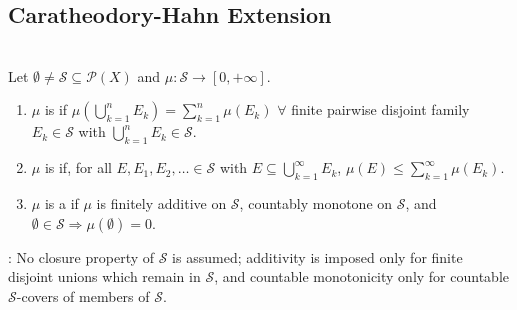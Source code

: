 \subsection{Caratheodory-Hahn Extension}

\begin{definition} \label{def:premeasure-on-set-family} \\
Let $\emptyset\neq\mathcal{S}\subseteq\mathcal{P}(X)$ and $\mu:\mathcal{S}\to[0,+\infty]$.
\begin{enumerate}[label=(\roman*)]
\setlength{\itemsep}{0pt}
\item $\mu$ is  if $\mu(\bigcup\limits_{k=1}^{n}E_k)=\sum\limits_{k=1}^{n}\mu(E_k)$ $\forall$ finite pairwise disjoint family $E_k\in\mathcal{S}$ with $\bigcup\limits_{k=1}^{n}E_k\in\mathcal{S}$.
\item $\mu$ is  if, for all $E,E_1,E_2,\ldots\in\mathcal{S}$ with $E\subseteq\bigcup\limits_{k=1}^{\infty}E_k$, $\mu(E)\leq\sum\limits_{k=1}^{\infty}\mu(E_k)$.
\item $\mu$ is a  if $\mu$ is finitely additive on $\mathcal{S}$, countably monotone on $\mathcal{S}$, and $\emptyset\in\mathcal{S}\Rightarrow\mu(\emptyset)=0$.
\end{enumerate}
: No closure property of $\mathcal{S}$ is assumed; additivity is imposed only for finite disjoint unions which remain in $\mathcal{S}$, and countable monotonicity only for countable $\mathcal{S}$-covers of members of $\mathcal{S}$.
\end{definition}


